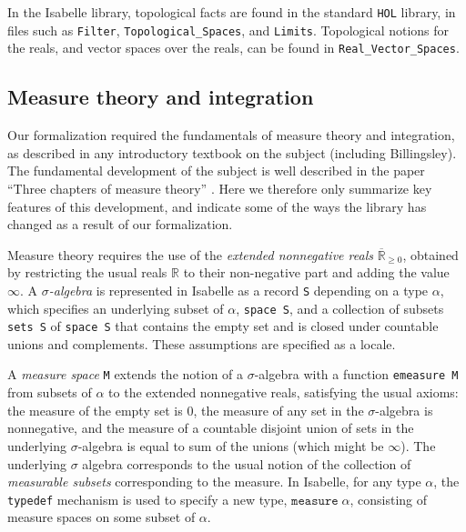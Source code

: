 \documentclass{svjour3}
\newcommand{\RR}{\mathbb{R}}
\newcommand{\ennRR}{\overline{\mathbb{R}}_{\ge 0}}
\begin{document}
In the Isabelle library, topological facts are found in the standard \texttt{HOL} library, in files such as \texttt{Filter}, \verb=Topological_Spaces=, and \texttt{Limits}. Topological notions for the reals, and vector spaces over the reals, can be found in \verb=Real_Vector_Spaces=.


\subsection{Measure theory and integration}
\label{subsection:measure:theory}

Our formalization required the fundamentals of measure theory and integration, as described in any introductory textbook on the subject (including Billingsley). The fundamental development of the subject is well described in the paper ``Three chapters of measure theory'' \cite{hoelzl:heller:11}. Here we therefore only summarize key features of this development, and indicate some of the ways the library has changed as a result of our formalization.

Measure theory requires the use of the \emph{extended nonnegative reals} $\ennRR$, obtained by restricting the usual reals $\RR$ to their non-negative part and adding the value $\infty$. A \emph{$\sigma$-algebra} is represented in Isabelle as a record \texttt{S} depending on a type $\alpha$, which specifies an underlying subset of $\alpha$, \texttt{space S}, and a collection of subsets \texttt{sets S} of \texttt{space S} that contains the empty set and is closed under countable unions and complements. These assumptions are specified as a locale. 

A \emph{measure space} \texttt{M} extends the notion of a $\sigma$-algebra with a function \texttt{emeasure M} from subsets of $\alpha$ to the extended nonnegative reals, satisfying the usual axioms: the measure of the empty set is $0$, the measure of any set in the $\sigma$-algebra is nonnegative, and the measure of a countable disjoint union of sets in the underlying $\sigma$-algebra is equal to sum of the unions (which might be $\infty$). The underlying $\sigma$ algebra corresponds to the usual notion of the collection of \emph{measurable subsets} corresponding to the measure. In Isabelle, for any type $\alpha$, the \texttt{typedef} mechanism is used to specify a new type, $\mathtt{measure} \; \alpha$, consisting of measure spaces on some subset of $\alpha$. 
\end{document}
